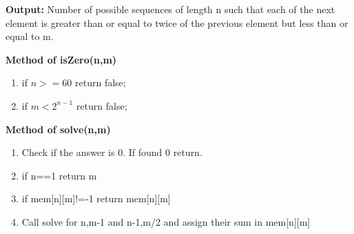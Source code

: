\documentclass[conference]{IEEEtran}
\begin{document}
\textbf{Output:} Number of possible sequences of length n such that each of the next element is greater than or equal to twice of the previous element but less than or equal to m.

\textbf{Method of isZero(n,m)}

\begin{enumerate}
    \item if $n>=60$ return false;
    \item if $m<2^{n-1}$ return false;
\end{enumerate}

\textbf{Method of solve(n,m)}

\begin{enumerate}
    \item Check if the answer is 0. If found 0 return.
    \item if n==1 return m
    \item if mem[n][m]!=-1 return mem[n][m]
    \item Call solve for n,m-1 and n-1,m/2 and assign their sum in mem[n][m]
	
\end{enumerate}
\end{document}
